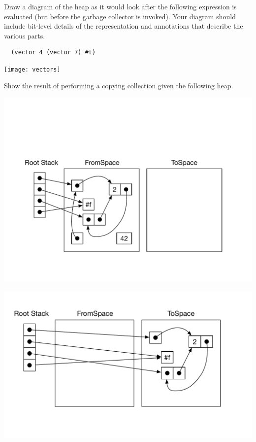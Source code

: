 \documentclass[12pt]{exam}
\begin{document}
\begin{questions}


\question[12] Draw a diagram of the heap as it would look after the
following expression is evaluated (but before the garbage collector is
invoked). Your diagram should include bit-level details of the
representation and annotations that describe the various parts.
\begin{lstlisting}
  (vector 4 (vector 7) #t)
\end{lstlisting}

\begin{solution}[4in]

\texttt{[image: vectors]}
\end{solution}

\pagebreak
\question[12] Show the result of performing a copying collection given
the following heap.

\includegraphics[width=6.5in]{copy-collect}


\begin{solution}

\includegraphics[width=6.5in]{copy-collect-soln}
\end{solution}

\end{questions}
\end{document}
